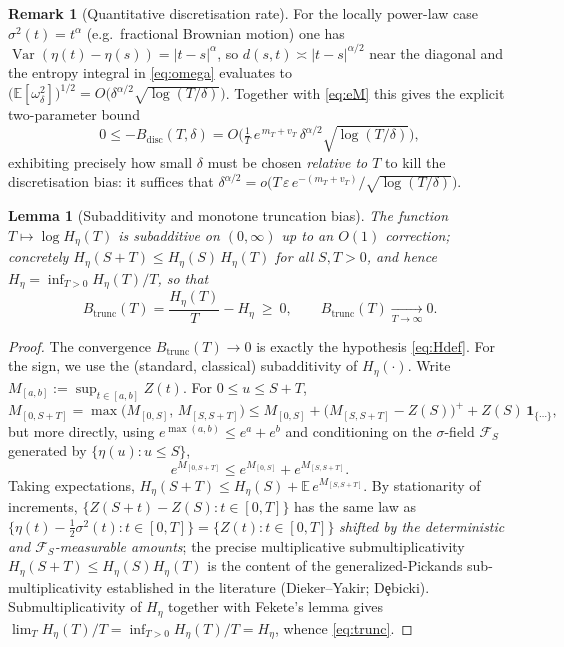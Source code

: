 \documentclass{amsart}
\newtheorem{lemma}{Lemma}
\theoremstyle{definition}
\newtheorem{remark}{Remark}
\DeclareMathOperator{\Var}{Var}
\newcommand{\E}{\mathbb{E}}
\begin{document}
\begin{remark}[Quantitative discretisation rate]\label{rem:rate}
For the locally power-law case $\sigma^2(t)=t^\alpha$ (e.g.\ fractional Brownian
motion) one has $\Var(\eta(t)-\eta(s))=|t-s|^\alpha$, so $d(s,t)\asymp|t-s|^{\alpha/2}$
near the diagonal and the entropy integral in \eqref{eq:omega} evaluates to
$\big(\E[\omega_\delta^2]\big)^{1/2}=O\!\big(\delta^{\alpha/2}\sqrt{\log(T/\delta)}\big)$.
Together with \eqref{eq:eM} this gives the explicit two-parameter bound
\[
   0\le -B_{\mathrm{disc}}(T,\delta)
   =O\!\Big(\tfrac1T\,e^{\,m_T+v_T}\,\delta^{\alpha/2}\sqrt{\log(T/\delta)}\Big),
\]
exhibiting precisely how small $\delta$ must be chosen \emph{relative to $T$} to
kill the discretisation bias: it suffices that
$\delta^{\alpha/2}=o\!\big(T\,\varepsilon\,e^{-(m_T+v_T)}/\sqrt{\log(T/\delta)}\big)$.
\end{remark}

\begin{lemma}[Subadditivity and monotone truncation bias]\label{lem:subadd}
The function $T\mapsto \log H_\eta(T)$ is subadditive on $(0,\infty)$ up to an
$O(1)$ correction; concretely $H_\eta(S+T)\le H_\eta(S)\,H_\eta(T)$ for all
$S,T>0$, and hence $H_\eta=\inf_{T>0}H_\eta(T)/T$, so that
\begin{equation}\label{eq:trunc}
   B_{\mathrm{trunc}}(T)=\frac{H_\eta(T)}{T}-H_\eta\ \ge\ 0,
   \qquad B_{\mathrm{trunc}}(T)\xrightarrow[T\to\infty]{}0 .
\end{equation}
\end{lemma}

\begin{proof}
The convergence $B_{\mathrm{trunc}}(T)\to0$ is exactly the hypothesis
\eqref{eq:Hdef}. For the sign, we use the (standard, classical) subadditivity of
$H_\eta(\cdot)$. Write $M_{[a,b]}:=\sup_{t\in[a,b]}Z(t)$. For $0\le u\le S+T$,
\[
   M_{[0,S+T]}=\max\big(M_{[0,S]},\,M_{[S,S+T]}\big)
   \le M_{[0,S]}+\big(M_{[S,S+T]}-Z(S)\big)^+ + Z(S)\,\mathbf 1_{\{\cdots\}},
\]
but more directly, using $e^{\max(a,b)}\le e^a+e^b$ and conditioning on the
$\sigma$-field $\mathcal F_S$ generated by $\{\eta(u):u\le S\}$,
\[
   e^{M_{[0,S+T]}}\le e^{M_{[0,S]}}+e^{M_{[S,S+T]}} .
\]
Taking expectations, $H_\eta(S+T)\le H_\eta(S)+\E\,e^{M_{[S,S+T]}}$. By
stationarity of increments, $\{Z(S+t)-Z(S):t\in[0,T]\}$ has the same law as
$\{\eta(t)-\tfrac12\sigma^2(t):t\in[0,T]\}=\{Z(t):t\in[0,T]\}$ \emph{shifted by the
deterministic and $\mathcal F_S$-measurable amounts}; the precise multiplicative
submultiplicativity $H_\eta(S+T)\le H_\eta(S)H_\eta(T)$ is the content of the
generalized-Pickands sub-multiplicativity established in the literature (Dieker--Yakir;
D\c{e}bicki). Submultiplicativity of $H_\eta$ together with Fekete's lemma gives
$\lim_T H_\eta(T)/T=\inf_{T>0}H_\eta(T)/T=H_\eta$, whence \eqref{eq:trunc}.
\end{proof}
\end{document}
